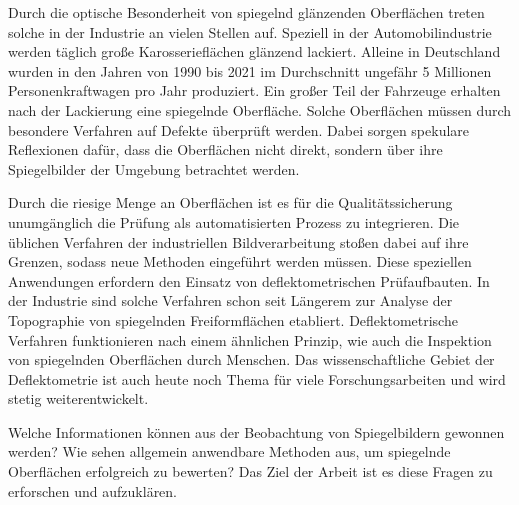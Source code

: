 Durch die optische Besonderheit von spiegelnd glänzenden Oberflächen treten solche in der Industrie an vielen Stellen auf.
Speziell in der Automobilindustrie werden täglich große Karosserieflächen glänzend lackiert.
Alleine in Deutschland wurden in den Jahren von 1990 bis 2021 im Durchschnitt ungefähr 5 Millionen Personenkraftwagen pro Jahr produziert\cite{StatistaPKW}.
Ein großer Teil der Fahrzeuge erhalten nach der Lackierung eine spiegelnde Oberfläche.
Solche Oberflächen müssen durch besondere Verfahren auf Defekte überprüft werden.
Dabei sorgen spekulare Reflexionen dafür, dass die Oberflächen nicht direkt, sondern über ihre Spiegelbilder der Umgebung betrachtet werden. %

\p
Durch die riesige Menge an Oberflächen ist es für die Qualitätssicherung unumgänglich die Prüfung als automatisierten Prozess zu integrieren.
Die üblichen Verfahren der industriellen Bildverarbeitung stoßen dabei auf ihre Grenzen, sodass neue Methoden eingeführt werden müssen.
Diese speziellen Anwendungen erfordern den Einsatz von deflektometrischen Prüfaufbauten.
In der Industrie sind solche Verfahren schon seit Längerem zur Analyse der Topographie von spiegelnden Freiformflächen etabliert.
Deflektometrische Verfahren funktionieren nach einem ähnlichen Prinzip, wie auch die Inspektion von spiegelnden Oberflächen durch Menschen.
Das wissenschaftliche Gebiet der Deflektometrie ist auch heute noch Thema für viele Forschungsarbeiten und wird stetig weiterentwickelt.

\p
Welche Informationen können aus der Beobachtung von Spiegelbildern gewonnen werden?
Wie sehen allgemein anwendbare Methoden aus, um spiegelnde Oberflächen erfolgreich zu bewerten?
Das Ziel der Arbeit ist es diese Fragen zu erforschen und aufzuklären.
